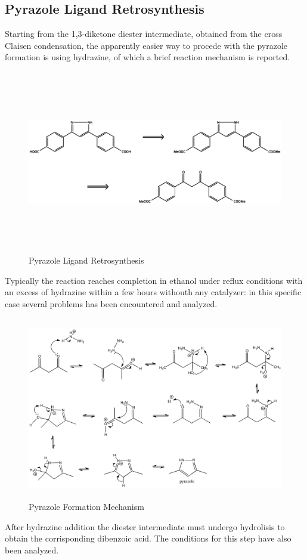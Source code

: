 \documentclass[../Master.tex]{subfiles}
\begin{document}
\subsection{Pyrazole Ligand Retrosynthesis}\label{sec:pyrazole-reaction}
Starting from the 1,3-diketone diester intermediate, obtained from the cross Claisen condensation, the apparently easier way to procede with the pyrazole formation is using hydrazine, of which a brief reaction mechanism is reported.

\begin{figure}[h!]
	\centering
	\includegraphics[width=16cm,height=8cm,keepaspectratio]{Structures/pyrazole-retro.eps}
	\caption{Pyrazole Ligand Retrosynthesis}\label{fig:pyrazole-retro}
\end{figure}

Typically the reaction reaches completion in ethanol under reflux conditions with an excess of hydrazine within a few hours withouth any catalyzer: in this specific case several problems has been encountered and analyzed.\\

\begin{figure}[h!]
	\centering
	\includegraphics[width=16cm,height=8cm,keepaspectratio]{Images/pyrazole-mechanism.png}
	\caption{Pyrazole Formation Mechanism}
\end{figure}
\newline
After hydrazine addition the diester intermediate must undergo hydrolisis to obtain the corrisponding dibenzoic acid. The conditions for this step have also been analyzed.
\end{document}
